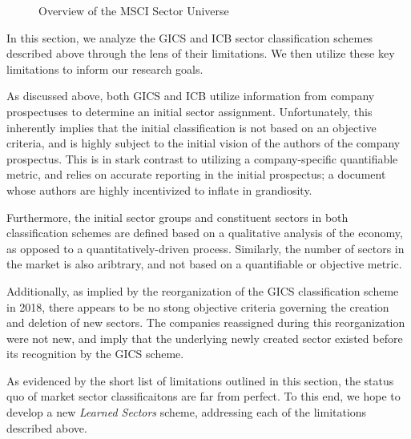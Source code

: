 \documentclass[../main.tex]{subfiles}
\begin{document}
\begin{figure}
    \centering
    \vspace{\wrapfigadjustment}
    \caption{Overview of the MSCI Sector Universe}
    \label{fig:introduction:icb_breakdown}
\end{figure}

In this section, we analyze the GICS and ICB sector classification schemes described above through the lens of their limitations. We then utilize these key limitations to inform our research goals.

As discussed above, both GICS and ICB utilize information from company prospectuses to determine an initial sector assignment. Unfortunately, this inherently implies that the initial classification is not based on an objective criteria, and is highly subject to the initial vision of the authors of the company prospectus. This is in stark contrast to utilizing a company-specific quantifiable metric, and relies on accurate reporting in the initial prospectus; a document whose authors are highly incentivized to inflate in grandiosity.

Furthermore, the initial sector groups and constituent sectors in both classification schemes are defined based on a qualitative analysis of the economy, as opposed to a quantitatively-driven process. Similarly, the number of sectors in the market is also aribtrary, and not based on a quantifiable or objective metric.

Additionally, as implied by the reorganization of the GICS classification scheme in 2018, there appears to be no stong objective criteria governing the creation and deletion of new sectors. The companies reassigned during this reorganization were not new, and imply that the underlying newly created sector existed before its recognition by the GICS scheme.

As evidenced by the short list of limitations outlined in this section, the status quo of market sector classificaitons are far from perfect. To this end, we hope to develop a new \textit{Learned Sectors} scheme, addressing each of the limitations described above.
\end{document}
